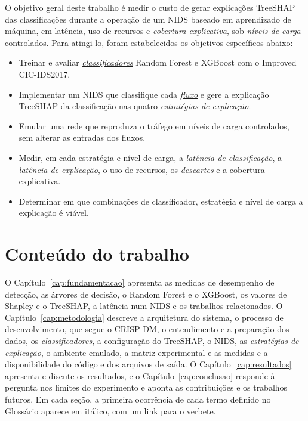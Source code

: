 \documentclass[
  12pt,
  oneside,
  a4paper,
  chapter=TITLE,
  sumario=tradicional,
  english,
  brazil
]{abntex2}
\newcommand{\termo}[2]{\hyperref[gl:#1]{\emph{#2}}}
\begin{document}
O objetivo geral deste trabalho é medir o custo de gerar explicações TreeSHAP das classificações
durante a operação de um NIDS baseado em aprendizado de máquina, em latência, uso de recursos e \termo{cobertura-explicativa}{cobertura
explicativa}, sob \termo{nivel-carga}{níveis de carga} controlados. Para atingi-lo, foram estabelecidos os objetivos
específicos abaixo:
\begin{itemize}
  \item Treinar e avaliar \termo{classificador}{classificadores} Random Forest e XGBoost com o Improved CIC-IDS2017.
  \item Implementar um NIDS que classifique cada \termo{fluxo}{fluxo} e gere a explicação TreeSHAP da classificação
  nas quatro \termo{estrategia}{estratégias de explicação}.
  \item Emular uma rede que reproduza o tráfego em níveis de carga controlados, sem
  alterar as entradas dos fluxos.
  \item Medir, em cada estratégia e nível de carga, a \termo{latencia-classificacao}{latência de classificação}, a \termo{latencia-explicacao}{latência de
  explicação}, o uso de recursos, os \termo{descarte}{descartes} e a cobertura explicativa.
  \item Determinar em que combinações de classificador, estratégia e nível de carga a explicação é
  viável.
\end{itemize}

\section{Conteúdo do trabalho}

O Capítulo~\ref{cap:fundamentacao} apresenta as medidas de desempenho de detecção, as árvores de decisão, o Random Forest e o XGBoost, os valores de
Shapley e o TreeSHAP, a latência num NIDS e os trabalhos relacionados. O
Capítulo~\ref{cap:metodologia} descreve a arquitetura do sistema, o processo de desenvolvimento, que
segue o CRISP-DM, o entendimento e a preparação dos dados, os
\termo{classificador}{classificadores}, a configuração do TreeSHAP, o NIDS, as
\termo{estrategia}{estratégias de explicação}, o ambiente emulado, a matriz experimental e as
medidas e a disponibilidade do código e dos arquivos de saída. O
Capítulo~\ref{cap:resultados} apresenta e discute os resultados, e o Capítulo~\ref{cap:conclusao}
responde à pergunta nos limites do experimento e aponta as contribuições e os trabalhos futuros.
Em cada seção, a primeira ocorrência de cada termo definido no Glossário aparece em itálico, com
um link para o verbete.
\end{document}
